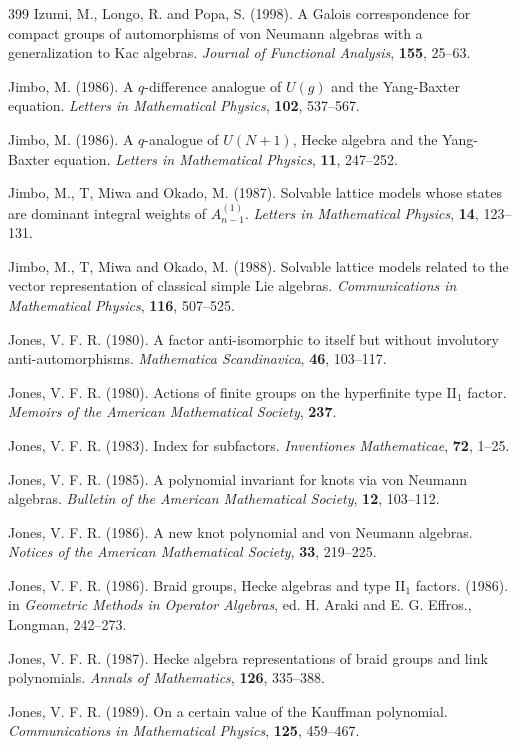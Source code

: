 \documentclass[12pt]{article}
\theoremstyle{plain}
\theoremstyle{definition}
\numberwithin{equation}{section}
\begin{document}
\begin{thebibliography} {399}
Izumi, M., Longo, R. and Popa, S. (1998).
A Galois correspondence for compact groups of automorphisms
of von Neumann algebras with a generalization to Kac algebras.
{\em Journal of Functional Analysis}, {\bf 155}, 25--63.

Jimbo, M. (1986).
A $q$-difference analogue of $U(g)$ and the Yang-Baxter
equation.
{\em Letters in Mathematical Physics},
{\bf 102}, 537--567.

Jimbo, M. (1986).
A $q$-analogue of $U(N+1)$, Hecke algebra and the
Yang-Baxter equation.
{\em Letters in Mathematical Physics},
{\bf 11}, 247--252.

Jimbo, M., T, Miwa and Okado, M. (1987).
Solvable lattice models whose states are dominant 
integral weights of $A^{(1)}_{n-1}$.
{\em Letters in Mathematical Physics}, {\bf 14}, 
123--131.

Jimbo, M., T, Miwa and Okado, M. (1988).
Solvable lattice models related to the vector 
representation of classical simple Lie algebras.
{\em Communications in Mathematical Physics},
{\bf 116}, 507--525.

Jones, V. F. R. (1980).
A factor anti-isomorphic to itself but without 
involutory anti-automorphisms.
{\em Mathematica Scandinavica}, {\bf 46}, 103--117.

Jones, V. F. R. (1980).
Actions of finite groups
on the hyperfinite type II$_1$ factor.
{\em Memoirs of the American Mathematical Society},
{\bf 237}.

Jones, V. F. R. (1983).
Index for subfactors.
{\em Inventiones Mathematicae}, {\bf 72}, 1--25.

Jones, V. F. R. (1985).
A polynomial invariant for knots via von Neumann algebras.
{\em Bulletin of the American Mathematical Society}, {\bf 12}, 103--112.

Jones, V. F. R. (1986).
A new knot polynomial and von Neumann algebras.
{\em Notices of the American Mathematical Society},
{\bf 33}, 219--225.

Jones, V. F. R. (1986).
Braid groups, Hecke algebras and type II$_1$ 
factors. (1986). in {\em Geometric Methods in
Operator Algebras}, ed. H. Araki and E. G. Effros.,
Longman, 242--273.

Jones, V. F. R. (1987).
Hecke algebra representations of braid groups and 
link polynomials. 
{\em Annals of Mathematics}, {\bf 126}, 335--388.

Jones, V. F. R. (1989).
On a certain value of the Kauffman polynomial.
{\em Communications in Mathematical Physics},  {\bf 125}, 459--467.


\end{thebibliography}
\end{document}
